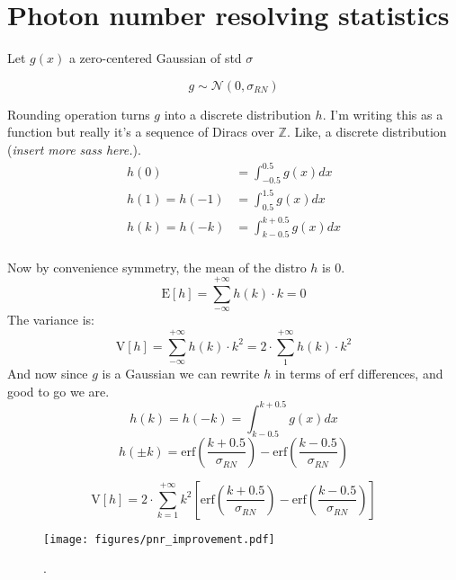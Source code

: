 \section{Photon number resolving statistics}\label{sec:pnr_derivation}
Let $g(x)$ a zero-centered Gaussian of std $\sigma$

$$
g \sim \mathcal{N}\left(0, \sigma_{RN}\right)
$$

Rounding operation turns $g$ into a discrete distribution $h$. I'm writing this as a function but really it's a sequence of Diracs over $\mathbb{Z}$. Like, a discrete distribution (\emph{insert more sass here.}).
\begin{align}
h(0) &= \int_{-0.5}^{0.5}g(x) dx\\
h(1) = h(-1) &= \int_{0.5}^{1.5}g(x) dx\\
h(k) = h(-k) &= \int_{k - 0.5}^{k + 0.5}g(x) dx\\
\end{align}

Now by convenience symmetry, the mean of the distro $h$ is 0.
\begin{equation}
\mathrm{E}[h] = \sum_{-\infty}^{+\infty} h(k) \cdot k = 0
\end{equation}
The variance is:
\begin{equation}
\mathrm{V}[h] = \sum_{-\infty}^{+\infty} h(k) \cdot k^2 = 2 \cdot \sum_{1}^{+\infty} h(k) \cdot k^2
\end{equation}
And now since $g$ is a Gaussian we can rewrite $h$ in terms of erf differences, and good to go we are.
\begin{equation}
h(k) = h(-k) = \int_{k - 0.5}^{k + 0.5}g(x) dx
\end{equation}
\begin{equation}
    h(\pm k) = \mathrm{erf}\left(\dfrac{k+0.5}{\sigma_{RN}}\right) - \mathrm{erf}\left(\dfrac{k-0.5}{\sigma_{RN}}\right)
\end{equation}

\begin{equation}
\label{eqn:var_pnr}
\mathrm{V}[h] = 2 \cdot \sum_{k=1}^{+\infty}  k^2 \left[%
\mathrm{erf}\left(\dfrac{k+0.5}{\sigma_{RN}}\right) - \mathrm{erf}\left(\dfrac{k-0.5}{\sigma_{RN}}\right)%
\right]
\end{equation}


\begin{figure}
    \centering
    \texttt{[image: figures/pnr\_improvement.pdf]}
    \caption{.\label{fig:pnr_improvement}}
\end{figure}

